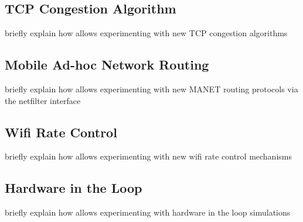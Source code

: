 %
\subsection{TCP Congestion Algorithm}
\label{subsec:experimentation-tcp-congestion}
%
briefly explain how \inet allows experimenting with new TCP congestion algorithms

%
\subsection{Mobile Ad-hoc Network Routing}
\label{subsec:experimentation-adhoc-routing}
%
briefly explain how \inet allows experimenting with new MANET routing protocols via the netfilter interface

%
\subsection{Wifi Rate Control}
\label{subsec:experimentation-wifi-ratecontrol}
%
briefly explain how \inet allows experimenting with new wifi rate control mechanisms

%
\subsection{Hardware in the Loop}
\label{subsec:experimentation-hardware-in-the-loop}
%
briefly explain how \inet allows experimenting with hardware in the loop simulations


%
\setcounter{tocdepth}{3}
\tableofcontents 
{}
%
\clearpage
\listoftodos
%
%

%
%
%
%
%
%
%
%

%

%
